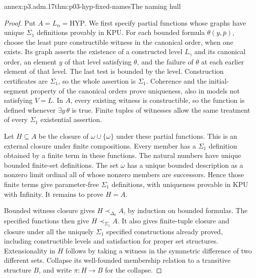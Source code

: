 \begin{annexitem}{annex:p3.adm.17}{thm:p03-hyp-fixed-names}{The naming hull}
\begin{proof}
Put \(A=L_\alpha=\mathrm{HYP}\). We first specify partial functions
whose graphs have unique \(\Sigma_1\) definitions provably in KPU.
For each bounded formula \(\theta(y,\bar p)\), choose the least pure
constructible witness in the canonical order, when one exists. Its
graph asserts the existence of a constructed level \(L_\gamma\) and
its canonical order, an element \(y\) of that level satisfying
\(\theta\), and the failure of \(\theta\) at each earlier element
of that level. The last test is bounded by the level. Construction
certificates are \(\Sigma_1\), so the whole assertion is
\(\Sigma_1\). Coherence and the initial-segment property of the
canonical orders prove uniqueness, also in models not satisfying
\(V=L\). In \(A\), every existing witness is constructible, so the
function is defined whenever \(\exists y\,\theta\) is true.
Finite tuples of witnesses allow the same treatment of every
\(\Sigma_1\) existential assertion.

Let \(H\subseteq A\) be the closure of \(\omega\cup\{\omega\}\)
under these partial functions. This is an external closure under
finite compositions. Every member has a \(\Sigma_1\) definition
obtained by a finite term in these functions. The natural numbers have
unique bounded finite-set definitions. The set \(\omega\) has a
unique bounded description as a nonzero limit ordinal all of whose
nonzero members are successors. Hence those finite terms give
parameter-free \(\Sigma_1\) definitions, with uniqueness provable
in KPU with Infinity. It remains to prove \(H=A\).

Bounded witness closure gives \(H\prec_{\Delta_0}A\), by induction
on bounded formulas. The specified functions then give
\(H\prec_{\Sigma_1}A\).
It also gives finite-tuple closure and closure under all the uniquely
\(\Sigma_1\) specified constructions already proved, including
constructible levels and satisfaction for proper set structures.
Extensionality in \(H\) follows by taking a witness in the symmetric
difference of two different sets. Collapse its well-founded membership
relation to a transitive structure \(B\), and write \(\pi:H\to B\)
for the collapse.


\end{proof}
\end{annexitem}
